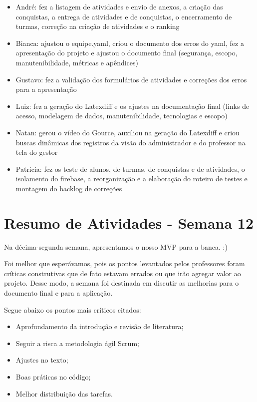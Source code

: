 \begin{apendicesenv}
\begin{itemize}
\item André: fez a listagem de atividades e envio de anexos, a criação das conquistas, a entrega de atividades e de conquistas, o encerramento de turmas, correção na criação de atividades e o ranking
\item Bianca: ajustou o equipe.yaml, criou o documento dos erros do yaml, fez a apresentação do projeto e ajustou o documento final (segurança, escopo, manutenibilidade, métricas e apêndices)
\item Gustavo: fez a validação dos formulários de atividades e correções dos erros para a apresentação
\item Luiz: fez a geração do Latexdiff e os ajustes na documentação final (links de acesso, modelagem de dados, manutenibilidade, tecnologias e escopo)
\item Natan: gerou o vídeo do Gource, auxiliou na geração do Latexdiff e criou buscas dinâmicas dos registros da visão do administrador e do professor na tela do gestor
\item Patricia: fez os teste de alunos, de turmas, de conquistas e de atividades, o isolamento do firebase, a reorganização e a elaboração do roteiro de testes e montagem do backlog de correções
\end{itemize}

\section{Resumo de Atividades - Semana 12}
Na décima-segunda semana, apresentamos o nosso MVP para a banca. :)

Foi melhor que esperávamos, pois os pontos levantados pelos professores foram críticas construtivas que de fato estavam errados ou que irão agregar valor ao projeto. Desse modo, a semana foi destinada em discutir as melhorias para o documento final e para a aplicação.

Segue abaixo os pontos mais críticos citados:

\begin{itemize}
\item Aprofundamento da introdução e revisão de literatura;
\item Seguir a risca a metodologia ágil Scrum;
\item Ajustes no texto;
\item Boas práticas no código;
\item Melhor distribuição das tarefas.
\end{itemize}


\end{apendicesenv}
